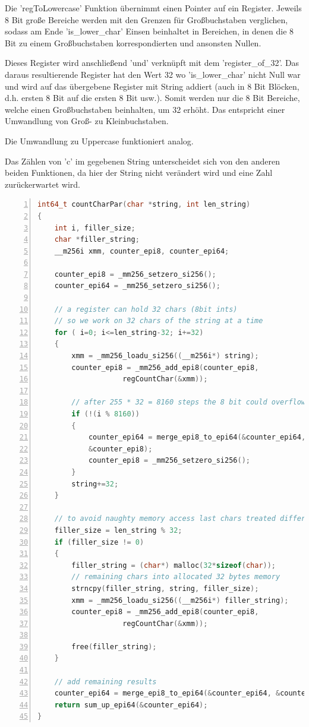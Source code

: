 \documentclass[plainarticle,zihtitle,german,final,hyperref,utf8]{zihpub}
\begin{document}
Die 'regToLowercase' Funktion übernimmt einen Pointer auf ein Register. Jeweils 8 Bit große Bereiche werden mit den Grenzen für Großbuchstaben verglichen, sodass am Ende 'is\_lower\_char' Einsen beinhaltet in Bereichen, in denen die 8 Bit zu einem Großbuchstaben korrespondierten und ansonsten Nullen.

Dieses Register wird anschließend 'und' verknüpft mit dem 'register\_of\_32'. Das daraus resultierende Register hat den Wert 32 wo 'is\_lower\_char' nicht Null war und wird auf das übergebene Register mit String addiert (auch in 8 Bit Blöcken, d.h. ersten 8 Bit auf die ersten 8 Bit usw.). Somit werden nur die 8 Bit Bereiche, welche einen Großbuchstaben beinhalten, um 32 erhöht. Das entspricht einer Umwandlung von Groß- zu Kleinbuchstaben.

Die Umwandlung zu Uppercase funktioniert analog.

Das Zählen von 'c' im gegebenen String unterscheidet sich von den anderen beiden Funktionen, da hier der String nicht verändert wird und eine Zahl zurückerwartet wird.

\begin{lstlisting}[language=c, numbers=left]
int64_t countCharPar(char *string, int len_string)
{
	int i, filler_size;
	char *filler_string;
	__m256i xmm, counter_epi8, counter_epi64;
	
	counter_epi8 = _mm256_setzero_si256();
	counter_epi64 = _mm256_setzero_si256();
	
	// a register can hold 32 chars (8bit ints)
	// so we work on 32 chars of the string at a time
	for ( i=0; i<=len_string-32; i+=32)
	{
		xmm = _mm256_loadu_si256((__m256i*) string);
		counter_epi8 = _mm256_add_epi8(counter_epi8,
					regCountChar(&xmm));
		
		// after 255 * 32 = 8160 steps the 8 bit could overflow
		if (!(i % 8160))
		{
			counter_epi64 = merge_epi8_to_epi64(&counter_epi64,
			&counter_epi8);
			counter_epi8 = _mm256_setzero_si256();
		}
		string+=32;
	}
	
	// to avoid naughty memory access last chars treated different
	filler_size = len_string % 32;
	if (filler_size != 0)
	{
		filler_string = (char*) malloc(32*sizeof(char));
		// remaining chars into allocated 32 bytes memory
		strncpy(filler_string, string, filler_size);
		xmm = _mm256_loadu_si256((__m256i*) filler_string);
		counter_epi8 = _mm256_add_epi8(counter_epi8,
					regCountChar(&xmm));
		
		free(filler_string);
	}
	
	// add remaining results
	counter_epi64 = merge_epi8_to_epi64(&counter_epi64, &counter_epi8);
	return sum_up_epi64(&counter_epi64);
}
\end{lstlisting}
\label{code:countCharPar}
\end{document}
